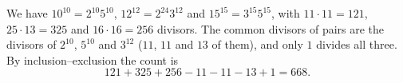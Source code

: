 We have $10^{10}=2^{10}5^{10}$, $12^{12}=2^{24}3^{12}$ and $15^{15}=3^{15}5^{15}$, with $11\cdot11=121$, $25\cdot13=325$ and $16\cdot16=256$ divisors. The common divisors of pairs are the divisors of $2^{10}$, $5^{10}$ and $3^{12}$ ($11$, $11$ and $13$ of them), and only $1$ divides all three. By inclusion--exclusion the count is
\[121+325+256-11-11-13+1=\boxed{668}.\]
